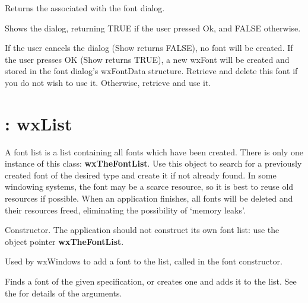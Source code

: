 
Returns the  associated with the font dialog.



Shows the dialog, returning TRUE if the user pressed Ok, and FALSE
otherwise.

If the user cancels the dialog (Show returns FALSE), no font will be
created. If the user presses OK (Show returns TRUE), a new wxFont will
be created and stored in the font dialog's wxFontData structure.
Retrieve and delete this font if you do not wish to use it. Otherwise,
retrieve and use it.

\section{: wxList}\label{wxfontlist}

A font list is a list containing all fonts which have been created. There
is only one instance of this class: {\bf wxTheFontList}.  Use this object to search
for a previously created font of the desired type and create it if not already found.
In some windowing systems, the font may be a scarce resource, so it is best to
reuse old resources if possible.  When an application finishes, all fonts will be
deleted and their resources freed, eliminating the possibility of `memory leaks'.



Constructor.  The application should not construct its own font list:
use the object pointer {\bf wxTheFontList}.



Used by wxWindows to add a font to the list, called in the font constructor.

\label{findorcreatefont}


Finds a font of the given specification, or creates one and adds it to the list. See the  for
details of the arguments.


